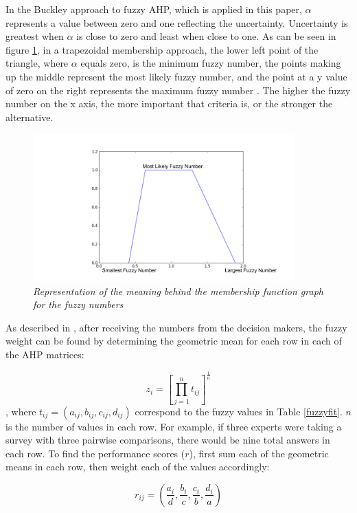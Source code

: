 In the Buckley approach to fuzzy AHP, which is applied in this paper, $\alpha$ represents a value between zero and one reflecting the uncertainty.  Uncertainty is greatest when $\alpha$ is close to zero and least when close to one. As can be seen in figure \ref{fuzzy_exp}, in a trapezoidal membership approach, the lower left point of the triangle, where $\alpha$ equals zero, is the minimum fuzzy number, the points making up the middle represent the most likely fuzzy number, and the point at a y value of zero on the right represents the maximum fuzzy number \cite{Pan2008}. The higher the fuzzy number on the x axis, the more important that criteria is, or the stronger the alternative.
\begin{figure}[h!]
  \centering
  \includegraphics[width=0.9\textwidth]{Fuzzy_explaination.png}
   \caption{\small \sl Representation of the meaning behind the membership function graph for the fuzzy numbers}
   \label{fuzzy_exp}
\end{figure}

 As described in \cite{Kahraman2010}, after receiving the numbers from the decision makers, the fuzzy weight can be found by determining the geometric mean for each row in each of the AHP matrices:

 \begin{equation}
 z_i=[\prod_{j=1}^n t_{ij}]^{\frac{1}{n}}
 \end{equation}, where $t_{ij}=(a_{ij},b_{ij}, c_{ij}, d_{ij})$ correspond to the fuzzy values in Table \ref{fuzzyfit}. $n$ is the number of values in each row.  For example, if three experts were taking a survey with three pairwise comparisons, there would be nine total answers in each row. To find the performance scores ($r$), first sum each of the geometric means in each row, then weight each of the values accordingly:

\begin{equation}
r_{ij}=(\frac{a_i}{d},\frac{b_i}{c},\frac{c_i}{b},\frac{d_i}{a})
\end{equation}

